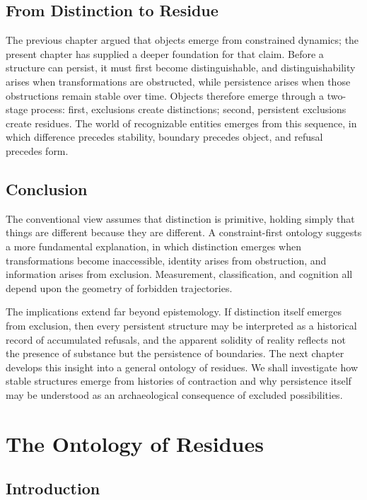 \documentclass[11pt,oneside]{book}
\theoremstyle{plain}
\theoremstyle{definition}
\theoremstyle{remark}
\begin{document}
\section{From Distinction to Residue}

The previous chapter argued that objects emerge from constrained dynamics; the present chapter has supplied a deeper foundation for that claim. Before a structure can persist, it must first become distinguishable, and distinguishability arises when transformations are obstructed, while persistence arises when those obstructions remain stable over time. Objects therefore emerge through a two-stage process: first, exclusions create distinctions; second, persistent exclusions create residues. The world of recognizable entities emerges from this sequence, in which difference precedes stability, boundary precedes object, and refusal precedes form.

\section{Conclusion}

The conventional view assumes that distinction is primitive, holding simply that things are different because they are different. A constraint-first ontology suggests a more fundamental explanation, in which distinction emerges when transformations become inaccessible, identity arises from obstruction, and information arises from exclusion. Measurement, classification, and cognition all depend upon the geometry of forbidden trajectories.

The implications extend far beyond epistemology. If distinction itself emerges from exclusion, then every persistent structure may be interpreted as a historical record of accumulated refusals, and the apparent solidity of reality reflects not the presence of substance but the persistence of boundaries. The next chapter develops this insight into a general ontology of residues. We shall investigate how stable structures emerge from histories of contraction and why persistence itself may be understood as an archaeological consequence of excluded possibilities.

\chapter{The Ontology of Residues}

\section{Introduction}
\end{document}
